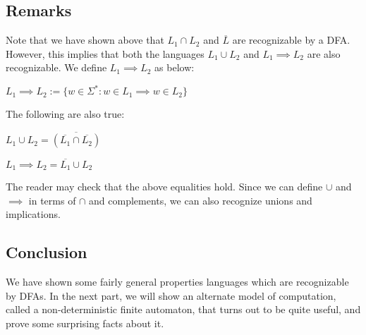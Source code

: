\subsection{Remarks}

Note that we have shown above that $L_1 \cap L_2$ and $\overline{L}$ are recognizable by a DFA.
However, this implies that both the languages $L_1 \cup L_2$ and $L_1 \implies L_2$ are also recognizable.
We define $L_1 \implies L_2$ as below:

$L_1 \implies L_2 := \{ w \in \Sigma^* : w \in L_1 \implies w \in L_2 \}$

The following are also true:

$L_1 \cup L_2 = \overline{(\overline{L_1} \cap \overline{L_2})}$

$L_1 \implies L_2 = \overline{L_1} \cup L_2$

The reader may check that the above equalities hold.
Since we can define $\cup$ and $\implies$ in terms of $\cap$ and complements, we can also recognize unions and implications.

\subsection{Conclusion}

We have shown some fairly general properties languages which are recognizable by DFAs.
In the next part, we will show an alternate model of computation, called a non-deterministic finite automaton, that turns out to be quite useful, and prove some surprising facts about it.

